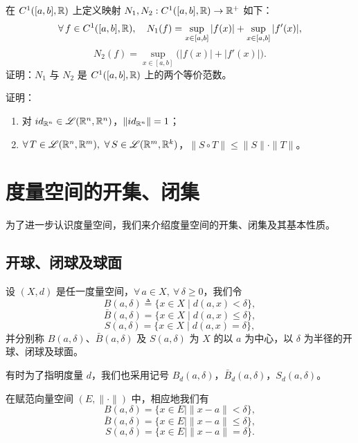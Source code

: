 \begin{exercise}
	\item 在 $C^1([a,b],\mathbb{R})$ 上定义映射 $N_1,N_2:C^1([a,b],\mathbb{R})\to\mathbb{R}^+$ 如下：
	\[\forall\,f\in C^1([a,b],\mathbb{R}),\quad N_1(f)=\sup_{x\in[a,b]}|f(x)|+\sup_{x\in[a,b]}|f'(x)|,\]
	\[N_2(f)=\sup_{x\in[a,b]}\bigl(|f(x)|+|f'(x)|\bigr).\]
	证明：$N_1$ 与 $N_2$ 是 $C^1([a,b],\mathbb{R})$ 上的两个等价范数。
\end{exercise}

\begin{exercise}
	\item 证明：
	\begin{enumerate}[label=\arabic*)]
		\item 对 $id_{\mathbb{R}^n}\in\mathscr{L}(\mathbb{R}^n,\mathbb{R}^n)$，$\|id_{\mathbb{R}^n}\|=1$；
		\item $\forall\,T\in\mathscr{L}(\R^n,\R^m),\ \forall\,S\in\mathscr{L}(\R^m,\R^k)$，$\|S\circ T\|\leqslant\|S\|\cdot\|T\|$。
	\end{enumerate}
\end{exercise}

\section{度量空间的开集、闭集}

为了进一步认识度量空间，我们来介绍度量空间的开集、闭集及其基本性质。

\subsection{开球、闭球及球面}
	\label{sec:10-2-1}

\begin{mydef*}{}

设 $(X,d)$ 是任一度量空间，$\forall\,a\in X,\ \forall\,\delta\geqslant0$，我们令
\[B(a,\delta)\triangleq\{x\in X\mid d(a,x)<\delta\},\]
\[\bar{B}(a,\delta)=\{x\in X\mid d(a,x)\leqslant\delta\},\]
\[S(a,\delta)=\{x\in X\mid d(a,x)=\delta\},\]
并分别称 $B(a,\delta)$、$\bar{B}(a,\delta)$ 及 $S(a,\delta)$ 为 $X$ 的以 $a$ 为中心，以 $\delta$ 为半径的开球、闭球及球面。

有时为了指明度量 $d$，我们也采用记号 $B_d(a,\delta)$，$\bar B_d(a,\delta)$，$S_d(a,\delta)$。

\end{mydef*}

在赋范向量空间 $(E,\|\cdot\|)$ 中，相应地我们有
\[B(a,\delta)=\{x\in E\mid\|x-a\|<\delta\},\]
\[\bar{B}(a,\delta)=\{x\in E\mid\|x-a\|\leqslant\delta\},\]
\[S(a,\delta)=\{x\in E\mid\|x-a\|=\delta\}.\]


